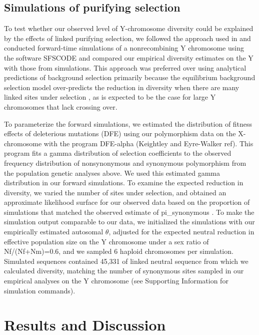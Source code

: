 \documentclass[9pt,twocolumn,twoside]{gsajnl}
\begin{document}
\subsection*{Simulations of purifying selection}
To test whether our observed level of Y-chromosome diversity could be explained by the effects of linked purifying selection, we followed the approach used in \citep{Wilsonsayres2014} and conducted forward-time simulations of a nonrecombining Y chromosome using the software SFSCODE \citep{hernandez2008flexible} and compared our empirical diversity estimates on the Y with those from simulations. This approach was preferred over using analytical predictions of background selection primarily because the equilibrium background selection model over-predicts the reduction in diversity when there are many linked sites under selection \citep{KaiserCharlesworth}, as is expected to be the case for large Y chromosomes that lack crossing over.

To parameterize the forward simulations, we estimated the distribution of fitness effects of deleterious mutations (DFE) using our polymorphism data on the X-chromosome with the program DFE-alpha (Keightley and Eyre-Walker ref). This program fits a gamma distribution of selection coefficients to the observed frequency distribution of nonsynonymous and synonymous polymorphism from the population genetic analyses above. We used this estimated gamma distribution in our forward simulations. To examine the expected reduction in diversity, we varied the number of sites under selection, and obtained an approximate likelihood surface for our observed data based on the proportion of simulations that matched the observed estimate of pi_synonymous . To make the simulation output comparable to our data, we initialized the simulations with our empirically estimated autosomal $\theta$, adjusted for the expected neutral reduction in effective population size on the Y chromosome under a sex ratio of Nf/(Nf+Nm)=0.6, and we sampled 6 haploid chromosomes per simulation. Simulated sequences contained 45,331 of linked neutral sequence from which we calculated diversity, matching the number of synonymous sites sampled in our empirical analyses on the Y chromosome (see Supporting Information for simulation commands).



\section*{Results and Discussion}
\end{document}
